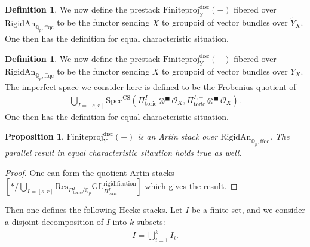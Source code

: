 \documentclass[12pt]{article}
\newtheorem{proposition}[theorem]{Proposition}
\theoremstyle{definition}
\newtheorem{definition}[theorem]{Definition}
\numberwithin{equation}{section}
\begin{document}
\begin{definition}
We now define the prestack $\mathrm{Finiteproj}^\mathrm{disc}_{\widetilde{Y}}(-)$ fibered over $\mathrm{RigidAn}_{\mathbb{Q}_p,\mathrm{ffqc}}$ to be the functor sending $X$ to groupoid of vector bundles over $\widetilde{Y}_X$. One then has the definition for equal characteristic situation. 
\end{definition}


\begin{definition}
We now define the prestack $\mathrm{Finiteproj}^\mathrm{disc}_{Y}(-)$ fibered over $\mathrm{RigidAn}_{\mathbb{Q}_p,\mathrm{ffqc}}$ to be the functor sending $X$ to groupoid of vector bundles over $Y_X$. The imperfect space we consider here is defined to be the Frobenius quotient of
\begin{align}
\bigcup_{I=[s,r]}\mathrm{Spec}^\mathrm{CS}({\Pi}^I_{\mathrm{toric}}\otimes^\blacksquare \mathcal{O}_X,{\Pi}_{\mathrm{toric}}^{I,+}\otimes^\blacksquare \mathcal{O}_X).	
\end{align}
One then has the definition for equal characteristic situation. 
\end{definition} 


\begin{proposition}
$\mathrm{Finiteproj}^\mathrm{disc}_{Y}(-)$ is an Artin stack over $\mathrm{RigidAn}_{\mathbb{Q}_p,\mathrm{ffqc}}$. The parallel result in equal characteristic sitaution holds true as well.
\end{proposition}

\begin{proof}
One can form the quotient Artin stacks $[*/\bigcup_{I=[s,r]}\mathrm{Res}_{\Pi^I_\mathrm{toric}/\mathbb{Q}_p}\mathrm{GL}^\mathrm{rigidification}_{\Pi^I_\mathrm{toric}}]$ which gives the result.	
\end{proof}




\indent Then one defines the following Hecke stacks. Let $I$ be a finite set, and we consider a disjoint decomposition of $I$ into $k$-subsets:
\begin{align}
I=\bigcup_{i=1}^k I_i.	
\end{align}
\end{document}
